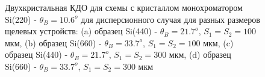 \begin{figure}[H]
  \centering
  \hfill
  \hfill
  \hfill
  \caption{Двухкристальная КДО для схемы с кристаллом монохроматором Si(220) - $\theta_B = 10.6^o$ для дисперсионного случая для разных размеров щелевых устройств:
  (a) образец Si(440) - $\theta_B = 21.7^o$, $S_1 = S_2 = 100$ мкм, (b) образец Si(660) - $\theta_B = 33.7^o$, $S_1 = S_2 = 100$ мкм,
   (c) образец Si(440) - $\theta_B = 21.7^o$, $S_1 = S_2 = 300$ мкм, (d) образец Si(660) - $\theta_B = 33.7^o$, $S_1 = S_2 = 300$ мкм}
  \label{ris:disspersion_curves_expantheory}
\end{figure}

